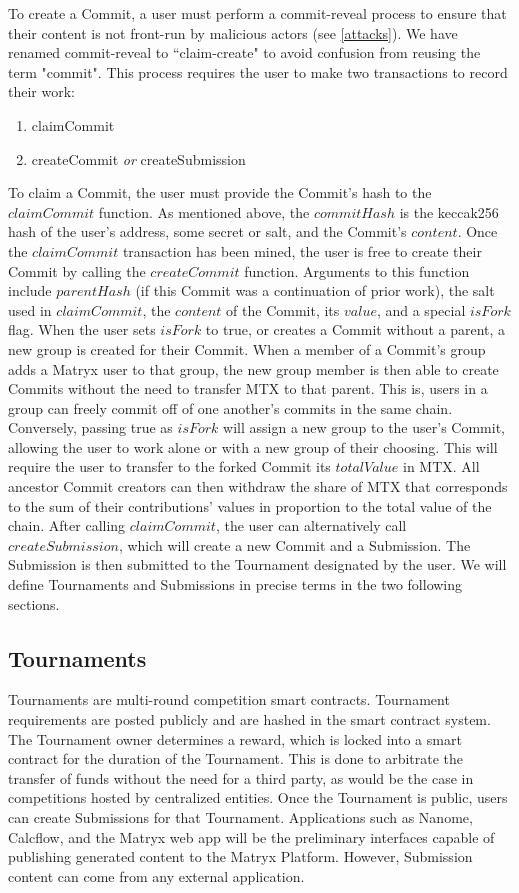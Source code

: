 \documentclass[a4paper, 10pt, conference]{ieeeconf}      %
\begin{document}
To create a Commit, a user must perform a commit-reveal process to ensure that their content is not front-run by malicious actors (see \ref{attacks}). We have renamed commit-reveal to ``claim-create" to avoid confusion from reusing the term "commit".
This process requires the user to make two transactions to record their work:
\begin{enumerate}
\item claimCommit
\item createCommit \textit{or} createSubmission
\end{enumerate}

To claim a Commit, the user must provide the Commit's hash to the $claimCommit$ function. As mentioned above, the $commitHash$ is the keccak256 hash of the user's address, some secret or salt, and the Commit's $content$. Once the $claimCommit$ transaction has been mined, the user is free to create their Commit by calling the $createCommit$ function. Arguments to this function include $parentHash$ (if this Commit was a continuation of prior work), the salt used in $claimCommit$, the $content$ of the Commit, its $value$, and a special $isFork$ flag. When the user sets $isFork$ to true, or creates a Commit without a parent, a new group is created for their Commit. When a member of a Commit's group adds a Matryx user to that group, the new group member is then able to create Commits without the need to transfer MTX to that parent. This is, users in a group can freely commit off of one another's commits in the same chain. Conversely, passing true as $isFork$ will assign a new group to the user's Commit, allowing the user to work alone or with a new group of their choosing. This will require the user to transfer to the forked Commit its $totalValue$ in MTX. All ancestor Commit creators can then withdraw the share of MTX that corresponds to the sum of their contributions' values in proportion to the total value of the chain. After calling $claimCommit$, the user can alternatively call $createSubmission$, which will create a new Commit and a Submission. The Submission is then submitted to the Tournament designated by the user. We will define Tournaments and Submissions in precise terms in the two following sections.

\subsection{Tournaments}\label{Tournaments}

Tournaments are multi-round competition smart contracts.
Tournament requirements are posted publicly and are hashed in the smart contract system. 
The Tournament owner determines a reward, which is locked into a smart contract for the duration of the Tournament. This is done to arbitrate the transfer of funds without the need for a third party, as would be the case in competitions hosted by centralized entities.
Once the Tournament is public, users can create Submissions for that Tournament.
Applications such as Nanome, Calcflow, and the Matryx web app will be the preliminary interfaces capable of publishing generated content to the Matryx Platform. However, Submission content can come from any external application.
\end{document}
